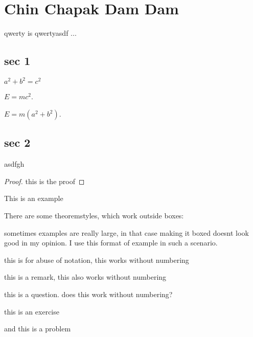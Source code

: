 \chapter{Chin Chapak Dam Dam}

\begin{defn}[qwerty]
qwerty is qwertyasdf ...
\end{defn}
\section{sec 1}

\begin{theorem}
\(a^2 + b^2 = c^2\)
\end{theorem}
\begin{lemma}[einstein]
\(E = mc^2\).
\end{lemma}
\begin{corollary}
\(E = m \left(a^2 + b^2\right) \).
\end{corollary}
\section{sec 2}

\begin{proposition}
asdfgh
\end{proposition}
\begin{proof}
this is the proof
\end{proof}
\begin{example}
This is an example
\end{example}
There are some theoremstyles, which work outside boxes:
\begin{ex}
sometimes examples are really large, in that case making it boxed doesnt look good in my opinion. I use this format of example in such a scenario.
\end{ex}
\begin{abuse}
this is for abuse of notation, this works without numbering
\end{abuse}
\begin{remark}
this is a remark, this also works without numbering
\end{remark}
\begin{ques}
this is a question. does this work without numbering?
\end{ques}



\pagebreak
\begin{exercise}
this is an exercise
\end{exercise}
\begin{problem}
and this is a problem
\end{problem}

